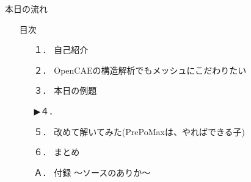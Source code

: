 \begin{frame}{本日の流れ}
  \begin{itemize}
      \item[] 目次
    \begin{enumerate}[label=\textbf{ \arabic*.},itemsep=1.3ex, leftmargin=1cm]
        \item[１．] 自己紹介
        \item[２．] OpenCAEの構造解析でもメッシュにこだわりたい
        \item[３．] 本日の例題
        \item[▶４．] 
        \item[５．] 改めて解いてみた(PrePoMaxは、やればできる子)
        \item[６．] まとめ
        \item[Ａ．] 付録 ～ソースのありか～
    \end{enumerate}
  \end{itemize}
\end{frame}
